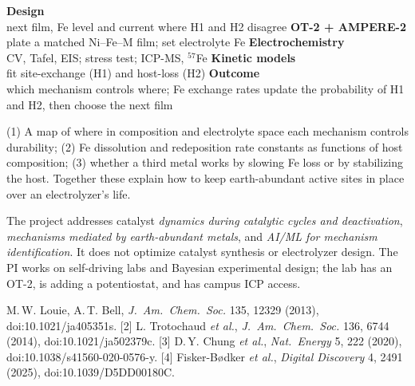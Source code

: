 \documentclass[11pt,letterpaper]{article}
\begin{document}
\wpflow
  {\textbf{Design}\\ next film, Fe level and current where H1 and H2 disagree}
  {\textbf{OT-2 + AMPERE-2}\\ plate a matched Ni--Fe--M film; set electrolyte Fe}
  {\textbf{Electrochemistry}\\ CV, Tafel, EIS; stress test; ICP-MS, $^{57}$Fe}
  {\textbf{Kinetic models}\\ fit site-exchange (H1) and host-loss (H2)}
  {\textbf{Outcome}\\ which mechanism controls where; Fe exchange rates}
  {update the probability of H1 and H2, then choose the next film}

 (1) A map of where in composition and electrolyte space each mechanism
controls durability; (2) Fe dissolution and redeposition rate constants as functions of host
composition; (3) whether a third metal works by slowing Fe loss or by stabilizing the host. Together
these explain how to keep earth-abundant active sites in place over an electrolyzer's life.

 The project addresses catalyst \emph{dynamics during catalytic cycles and
deactivation}, \emph{mechanisms mediated by earth-abundant metals}, and
\emph{AI/ML for mechanism identification}. It does not optimize catalyst synthesis or electrolyzer
design. The PI works on self-driving labs and Bayesian experimental design; the lab has an OT-2, is
adding a potentiostat, and has campus ICP access.

\begin{wprefs}
[1] M.\,W. Louie, A.\,T. Bell, \emph{J.\ Am.\ Chem.\ Soc.} 135, 12329 (2013), doi:10.1021/ja405351s.
[2] L. Trotochaud \emph{et al.}, \emph{J.\ Am.\ Chem.\ Soc.} 136, 6744 (2014), doi:10.1021/ja502379c.
[3] D.\,Y. Chung \emph{et al.}, \emph{Nat.\ Energy} 5, 222 (2020), doi:10.1038/s41560-020-0576-y.
[4] Fisker-B{\o}dker \emph{et al.}, \emph{Digital Discovery} 4, 2491 (2025), doi:10.1039/D5DD00180C.
\end{wprefs}
\end{document}
